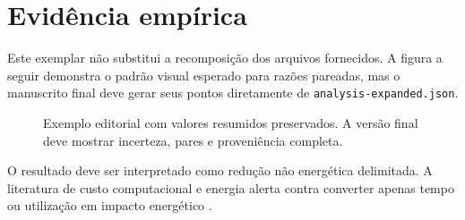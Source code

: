 \chapter{Evidência empírica}
\label{chap:evidencia}

Este exemplar não substitui a recomposição dos arquivos fornecidos. A figura a
seguir demonstra o padrão visual esperado para razões pareadas, mas o manuscrito
final deve gerar seus pontos diretamente de
\texttt{analysis-expanded.json}.

\begin{figure}[htbp]
\centering
{}
\caption{Exemplo editorial com valores resumidos preservados. A versão final
deve mostrar incerteza, pares e proveniência completa.}
\label{fig:razoes}
\end{figure}

O resultado deve ser interpretado como redução não energética delimitada. A
literatura de custo computacional e energia alerta contra converter apenas
tempo ou utilização em impacto energético \parencite{strubell2019energy,
schwartz2020greenai}.

